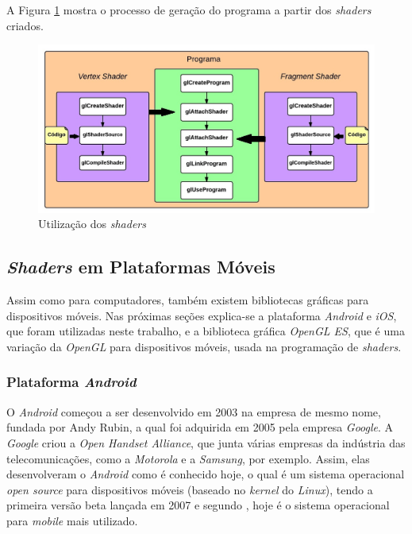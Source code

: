 	A Figura \ref{shader_use} mostra o processo de geração do programa a partir dos \textit{shaders} criados.

	\begin{figure}[ht]
	\centering
		\includegraphics[keepaspectratio=true,scale=0.4]{figuras/shader_use.jpg}
	\caption{Utilização dos \textit{shaders}}
	\label{shader_use}
	\end{figure}


\subsection{\textit{Shaders} em Plataformas Móveis}

	Assim como para computadores, também existem bibliotecas gráficas para dispositivos móveis. Nas próximas seções explica-se a plataforma \textit{Android} e \textit{iOS}, que foram utilizadas neste trabalho, e a biblioteca gráfica \textit{OpenGL ES}, que é uma variação da \textit{OpenGL} para dispositivos móveis, usada na programação de \textit{shaders}.

	\subsubsection{Plataforma \textit{Android}}

	O \textit{Android} começou a ser desenvolvido em 2003 na empresa de mesmo nome, fundada por Andy Rubin, a qual foi adquirida em 2005 pela empresa \textit{Google}. A \textit{Google} criou a \textit{Open Handset Alliance}, que junta várias empresas da indústria das telecomunicações, como a \textit{Motorola} e a \textit{Samsung}, por exemplo. Assim, elas desenvolveram o \textit{Android} como é conhecido hoje, o qual é um sistema operacional  \textit{open source} para dispositivos móveis (baseado no \textit{kernel} do \textit{Linux}), tendo a primeira versão beta lançada em 2007 e segundo \cite{android2013}, hoje é o sistema operacional para \textit{mobile} mais utilizado.

